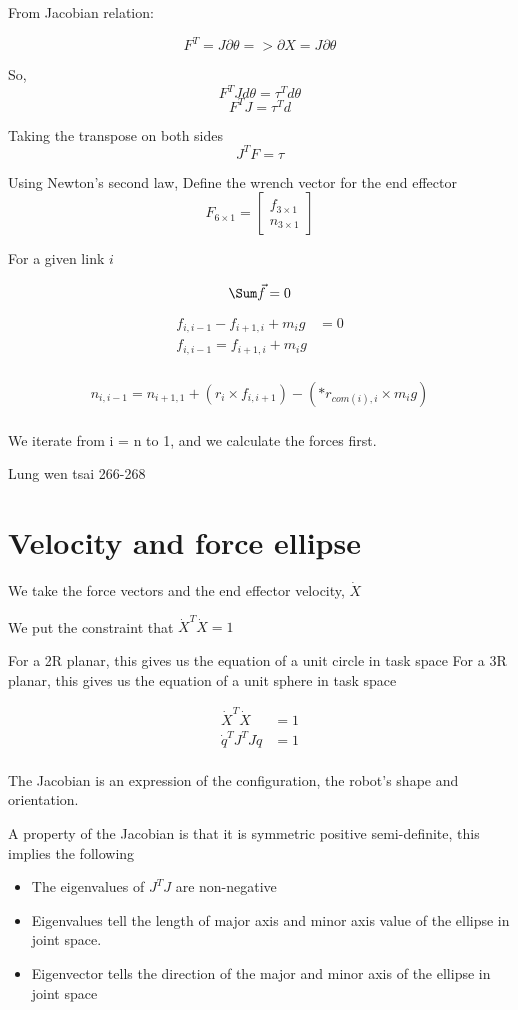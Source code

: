 \documentclass[11pt]{report}
\begin{document}
From Jacobian relation:

$$F^T = J \partial \theta => \partial X = J \partial \theta$$

So,
$$F^T J d \theta = \tau^T d \theta$$
$$F^T J = \tau^T d$$

Taking the transpose on both sides
$$J^{T} F  = \tau$$

Using Newton's second law,
Define the wrench vector for the end effector
$$F_{6 \times 1} = \begin{bmatrix}f_{3 \times 1} \\ n_{3 \times 1}\end{bmatrix}$$


For a given link \(i\)

$$\Sum \vec{f} = 0$$

\begin{align*}
f_{i,i-1} - f_{i+1,i} + m_ig &= 0 \\
f_{i,i-1} = f_{i+1,i} + m_ig  \\
\end{align*}

\begin{align*}
n_{i,i-1} = n_{i+1,1} + (r_i \times f_{i,i+1}) - (*r_{com(i),i} \times m_i g) \\
\end{align*}

We iterate from i = n to 1, and we calculate the forces first.

Lung wen tsai 266-268
\chapter{Velocity and force ellipse}
\label{sec:orgc58d4e9}
We take the force vectors and the end effector velocity, \(\dot{X}\)

We put the constraint that \(\dot{X}^T\dot{X} = 1\)

For a 2R planar, this gives us the equation of a unit circle in task space
For a 3R planar, this gives us the equation of a unit sphere in task space

\begin{align*}
\dot{X}^T\dot{X} &= 1 \\
\dot{q}^{T}J^{T} J \dot{q} &= 1 \\
\end{align*}

The Jacobian is an expression of the configuration, the robot's shape and orientation.

A property of the Jacobian is that it is symmetric positive semi-definite, this implies the following
\begin{itemize}
\item The eigenvalues of \(J^{T} J\) are non-negative
\item Eigenvalues tell the length of major axis and minor axis value of the ellipse in joint space.
\item Eigenvector tells the direction of the major and minor axis of the ellipse in joint space
\end{itemize}
\end{document}
